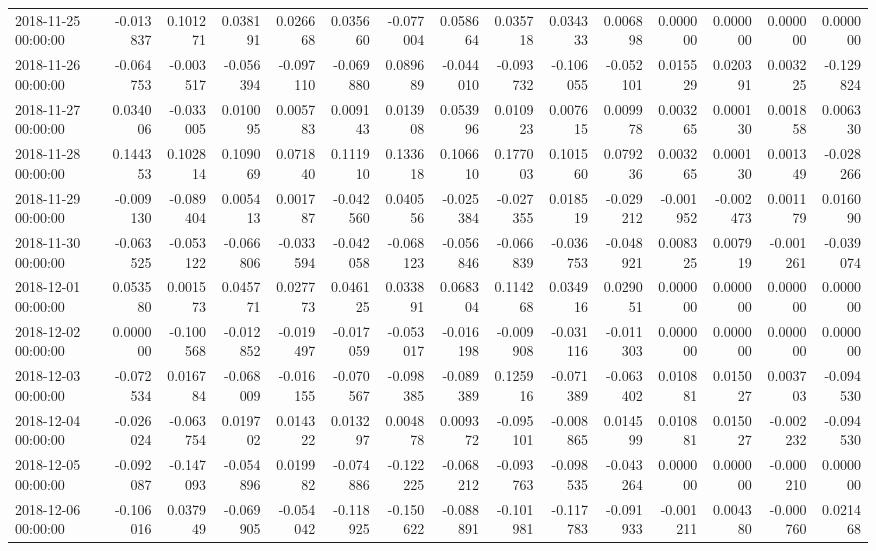 \begin{tabular}{lrrrrrrrrrrrrrr}
2018-11-25 00:00:00 & -0.013837 & 0.101271 & 0.038191 & 0.026668 & 0.035660 & -0.077004 & 0.058664 & 0.035718 & 0.034333 & 0.006898 & 0.000000 & 0.000000 & 0.000000 & 0.000000 \\
2018-11-26 00:00:00 & -0.064753 & -0.003517 & -0.056394 & -0.097110 & -0.069880 & 0.089689 & -0.044010 & -0.093732 & -0.106055 & -0.052101 & 0.015529 & 0.020391 & 0.003225 & -0.129824 \\
2018-11-27 00:00:00 & 0.034006 & -0.033005 & 0.010095 & 0.005783 & 0.009143 & 0.013908 & 0.053996 & 0.010923 & 0.007615 & 0.009978 & 0.003265 & 0.000130 & 0.001858 & 0.006330 \\
2018-11-28 00:00:00 & 0.144353 & 0.102814 & 0.109069 & 0.071840 & 0.111910 & 0.133618 & 0.106610 & 0.177003 & 0.101560 & 0.079236 & 0.003265 & 0.000130 & 0.001349 & -0.028266 \\
2018-11-29 00:00:00 & -0.009130 & -0.089404 & 0.005413 & 0.001787 & -0.042560 & 0.040556 & -0.025384 & -0.027355 & 0.018519 & -0.029212 & -0.001952 & -0.002473 & 0.001179 & 0.016090 \\
2018-11-30 00:00:00 & -0.063525 & -0.053122 & -0.066806 & -0.033594 & -0.042058 & -0.068123 & -0.056846 & -0.066839 & -0.036753 & -0.048921 & 0.008325 & 0.007919 & -0.001261 & -0.039074 \\
2018-12-01 00:00:00 & 0.053580 & 0.001573 & 0.045771 & 0.027773 & 0.046125 & 0.033891 & 0.068304 & 0.114268 & 0.034916 & 0.029051 & 0.000000 & 0.000000 & 0.000000 & 0.000000 \\
2018-12-02 00:00:00 & 0.000000 & -0.100568 & -0.012852 & -0.019497 & -0.017059 & -0.053017 & -0.016198 & -0.009908 & -0.031116 & -0.011303 & 0.000000 & 0.000000 & 0.000000 & 0.000000 \\
2018-12-03 00:00:00 & -0.072534 & 0.016784 & -0.068009 & -0.016155 & -0.070567 & -0.098385 & -0.089389 & 0.125916 & -0.071389 & -0.063402 & 0.010881 & 0.015027 & 0.003703 & -0.094530 \\
2018-12-04 00:00:00 & -0.026024 & -0.063754 & 0.019702 & 0.014322 & 0.013297 & 0.004878 & 0.009372 & -0.095101 & -0.008865 & 0.014599 & 0.010881 & 0.015027 & -0.002232 & -0.094530 \\
2018-12-05 00:00:00 & -0.092087 & -0.147093 & -0.054896 & 0.019982 & -0.074886 & -0.122225 & -0.068212 & -0.093763 & -0.098535 & -0.043264 & 0.000000 & 0.000000 & -0.000210 & 0.000000 \\
2018-12-06 00:00:00 & -0.106016 & 0.037949 & -0.069905 & -0.054042 & -0.118925 & -0.150622 & -0.088891 & -0.101981 & -0.117783 & -0.091933 & -0.001211 & 0.004380 & -0.000760 & 0.021468 \\

\end{tabular}
